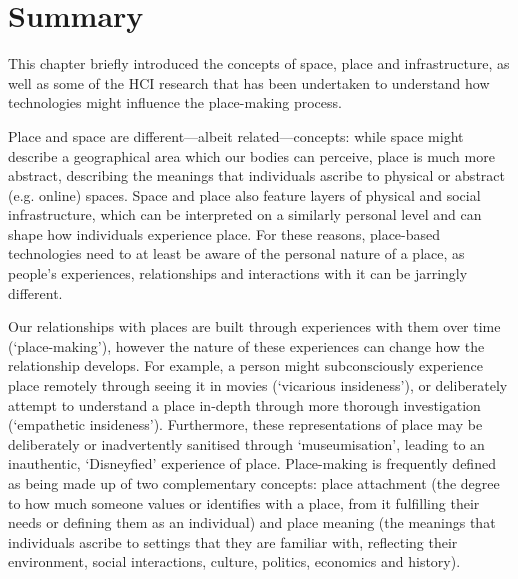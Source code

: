 \section{Summary}

This chapter briefly introduced the concepts of space, place and infrastructure, as well as some of the HCI research that has been undertaken to understand how technologies might influence the place-making process.

Place and space are different---albeit related---concepts: while space might describe a geographical area which our bodies can perceive, place is much more abstract, describing the meanings that individuals ascribe to physical or abstract (e.g. online) spaces. Space and place also feature layers of physical and social infrastructure, which can be interpreted on a similarly personal level and can shape how individuals experience place. For these reasons, place-based technologies need to at least be aware of the personal nature of a place, as people's experiences, relationships and interactions with it can be jarringly different.

Our relationships with places are built through experiences with them over time (`place-making'), however the nature of these experiences can change how the relationship develops. For example, a person might subconsciously experience place remotely through seeing it in movies (`vicarious insideness'), or deliberately attempt to understand a place in-depth through more thorough investigation (`empathetic insideness'). Furthermore, these representations of place may be deliberately or inadvertently sanitised through `museumisation', leading to an inauthentic, `Disneyfied' experience of place. Place-making is frequently defined as being made up of two complementary concepts: place attachment (the degree to how much someone values or identifies with a place, from it fulfilling their needs or defining them as an individual) and place meaning (the meanings that individuals ascribe to settings that they are familiar with, reflecting their environment, social interactions, culture, politics, economics and history). 


